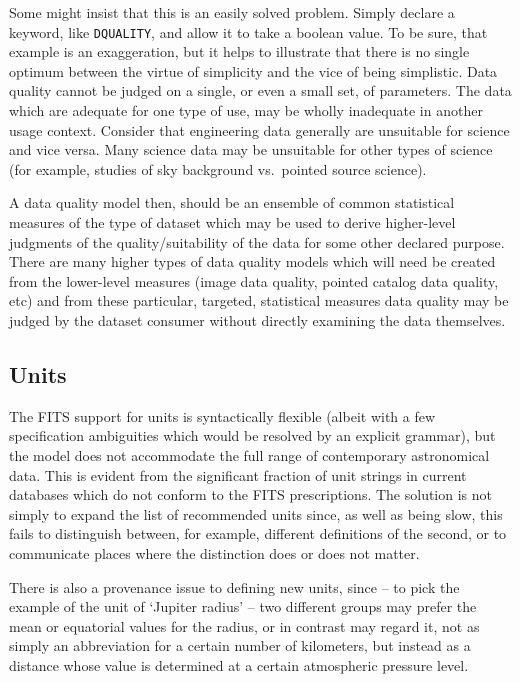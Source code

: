 \documentclass[final,authoryear,5p,times,twocolumn]{elsarticle}
\begin{document}
{{Some might insist that this is an easily solved problem. Simply
declare a keyword, like \texttt{DQUALITY}, and allow it to take a boolean
value. To be sure, that example is an exaggeration, but it helps to
illustrate that there is no single optimum between the virtue of
simplicity and the vice of being simplistic.
Data quality cannot be judged on a single, or even a
small set, of parameters. The
data which are adequate for one type of use, may be wholly inadequate
in another usage context. Consider that engineering data generally are
unsuitable for science and vice versa. Many science data may be
unsuitable for other types of science (for example, studies of sky
background vs.\ pointed source science).


A data quality model then, should be an ensemble of common statistical
measures of the type of dataset which may be used to derive
higher-level judgments of the quality/suitability of the data for
some other declared purpose. There are many higher types of data
quality models which will need be created from the lower-level
measures (image data quality, pointed catalog data quality, etc) and
from these particular, targeted, statistical measures data quality may
be judged by the dataset consumer without directly examining the data
themselves.


\subsection{Units}


The FITS support for units is syntactically flexible (albeit with
a few specification ambiguities which would be resolved by an explicit
grammar), but the model does not accommodate the full range of
contemporary astronomical data.  This is evident from the significant
fraction of unit strings in current databases which do not conform to
the FITS prescriptions.  The solution is not simply to expand the list
of recommended units since, as well as being slow, this fails to
distinguish between, for example, different definitions of the second,
or to communicate places where the distinction does or does not
matter.

There is also a provenance issue to defining new units, since -- to
pick the example of the unit of `Jupiter radius' -- two different
groups may prefer the mean or equatorial values for the radius, or in contrast
may regard it, not as simply an abbreviation for a certain number of
kilometers, but instead as a distance whose value is determined at a
certain atmospheric pressure level.

}}
\end{document}
